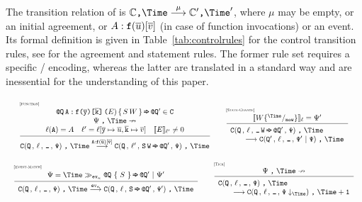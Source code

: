The transition relation of {\Stipula} is
$\contract {\comma} \Time \lred{\mu} \contract' {\comma} \Time'$,
where $\mu$ may be empty, or an initial agreement, or
$A:\texttt{f}(\overline{u})[\overline{v}]$ (in case of function invocations) or an event.
%
Its formal definition is given in Table~\ref{tab:controlrules} for the
control transition rules, see \cite{CrafaLSV23} for the agreement and
statement rules. The former rule set requires a specific
{\JML}/{\Java} encoding, whereas the latter are translated in a
standard way and are inessential for the understanding of this paper.
%
\begin{table}[t]
{\small
$
\begin{array}{c}
\mathrule{Function}{
	\begin{array}{c}
	\texttt{@}\state\,\A\,\texttt{:}\,\f\texttt{(} \wt{\mbox{{\tt y}}} \texttt{)[} \wt{\mbox{{\tt k}}} \texttt{]\,(} E {\tt )}\,{\tt \{}\,S\,W\,{\tt \}} \tostate \texttt{@}\state' \in \C
	\\
	\nored{\SemEvent}{\Time}
	\\
	\ell(\A) = A
	\quad
	\ell' = \ell [ \wt{\mbox{{\tt y}}} \mapsto \wt{u}, \wt{\mbox{{\tt k}}} \mapsto \wt{v} ]
	\quad
	\sem{E}_{\ell'} \neq 0
	\end{array}
	}{
	\C(\state \semi \ell \semi \zero \semi \SemEvent) \comma \Time 
	    \lred{A : \texttt{f}(\wt{u})[\wt{v}]}
	\C(\state \semi \ell' \semi S\,W \tostate \texttt{@}\state' 
	\semi \SemEvent) \comma \Time
}	
\quad
\mathrule{State-Change}{
    \sem{W\subst{\Time}{\texttt{now}}}_{\ell} = \SemEvent'
    }{
    \begin{array}{l}
	\C(\state \semi \ell \semi \zero \,W\tostate \texttt{@}\state' \semi \SemEvent) 
	\comma \Time 
	\\
	\qquad \lred{}
	\C(\state' \semi \ell \semi \zero \semi \SemEvent' ~|~\SemEvent) 
	\comma \Time
	\end{array}
}
\\
\\
\mathrule{Event-Match}{
	\begin{array}{c}
	\SemEvent = \Time \event_{\ev_\kappa} \texttt{@}\state~\{~S~\} \tostate \texttt{@}\state' ~|~ \SemEvent'
	\end{array}
	}{
	\begin{array}{l}
	\C(\state \semi \ell \semi \zero \semi \SemEvent) \comma \Time 
\lred{\ev_\kappa}
	\C(\state \semi \ell \semi S \tostate \texttt{@}\state' \semi \SemEvent') 
	\comma \Time  
	\end{array} 
}
\quad
\mathrule{Tick}{
	\nored{\SemEvent}{\Time}
	}{
	\begin{array}{l}
	\C(\state \semi \ell \semi \zero \semi \SemEvent) \comma \Time 
	\\
	\qquad 
\lred{} 
	\C(\state \semi \ell \semi \zero \semi \SemEvent\downarrow_{\Time}) \comma \Time + 1
	\end{array}
	}
\\
\\
\end{array}
$
}
\caption{\label{tab:controlrules} The control transition rules of {\Stipula}}
\vspace{-.6cm}
\end{table}

